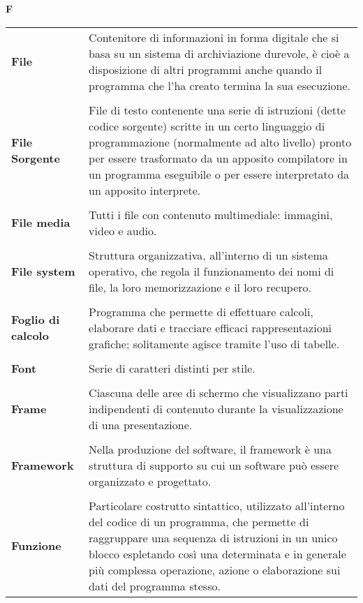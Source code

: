{\begin{longtable}{L{4cm} p{10cm}}
 \\ 
\end{longtable} 
\newpage 
{} 
{} 
\hfill\Huge{\textbf{F}} \\ 
\normalsize 
\begin{longtable}{L{4cm} p{10cm}}
\textbf{File} & Contenitore di informazioni in forma digitale che si basa su un sistema di archiviazione durevole, è cioè a disposizione di altri programmi anche quando il programma che l’ha creato termina la sua esecuzione. \\ 
 \\ 
\textbf{File Sorgente} & File di testo contenente una serie di istruzioni (dette codice sorgente) scritte in un certo linguaggio di programmazione (normalmente ad alto livello) pronto per essere trasformato da un apposito compilatore in un programma eseguibile o per essere interpretato da un apposito interprete. \\ 
 \\ 
\textbf{File media} & Tutti i file con contenuto multimediale: immagini, video e audio. \\ 
 \\ 
\textbf{File system} & Struttura organizzativa, all’interno di un sistema operativo, che regola il funzionamento dei nomi di file, la loro memorizzazione e il loro recupero. \\ 
 \\ 
\textbf{Foglio di calcolo} & Programma che permette di effettuare calcoli, elaborare dati e tracciare efficaci rappresentazioni grafiche; solitamente agisce tramite l’uso di tabelle. \\ 
 \\ 
\textbf{Font} & Serie di caratteri distinti per stile. \\ 
 \\ 
\textbf{Frame} & Ciascuna delle aree di schermo che visualizzano parti indipendenti di contenuto durante la visualizzazione di una presentazione. \\ 
 \\ 
\textbf{Framework} & Nella produzione del software, il framework è una struttura di supporto su cui un software può essere organizzato e progettato. \\ 
 \\ 
\textbf{Funzione} & Particolare costrutto sintattico, utilizzato all’interno del codice di un programma, che permette di raggruppare una sequenza di istruzioni in un unico blocco espletando così una determinata e in generale più complessa operazione, azione o elaborazione sui dati del programma stesso. \\ 

\end{longtable}}
